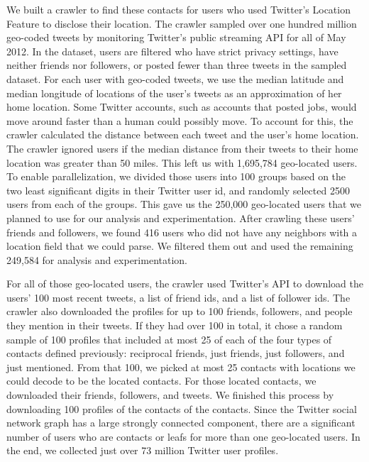 We built a crawler to find these contacts for users who used Twitter's Location
Feature to disclose their location.
The crawler sampled over one hundred million geo-coded tweets by monitoring
Twitter's public streaming API for all of May 2012.
In the dataset, users are filtered who have strict privacy settings, have
neither friends nor followers, or posted fewer than three tweets in the sampled
dataset.
For each user with geo-coded tweets, we use the median latitude and median
longitude of locations of the user's tweets as an approximation of her home
location.
Some Twitter accounts, such as accounts that posted jobs, would
move around faster than a human could possibly move.
To account for this, the crawler calculated the distance between each tweet and
the user's home location.
The crawler ignored users if the median distance from their tweets to their
home location was greater than 50 miles.
This left us with 1,695,784 geo-located users.
To enable parallelization, we divided those users into 100 groups based on
the two least significant digits in their Twitter user id, and randomly selected
2500 users from each of the groups.
%
This gave us the 250,000 geo-located users that we planned to use for our
analysis and experimentation.
%
After crawling these users' friends and followers, we found 416 users who did
not have any neighbors with a location field that we could parse.
%
We filtered them out and used the remaining 249,584 for analysis and
experimentation.

For all of those geo-located users, the crawler used Twitter's API to download
the users' 100 most recent tweets, a list of friend ids, and a list of follower ids.
The crawler also downloaded the profiles for up to 100 friends, followers, and
people they mention in their tweets.
%
If they had over 100 in total, it chose a random sample of 100 profiles that
included at most 25 of each of the four types of contacts defined previously:
reciprocal friends, just friends, just followers, and just mentioned.
%
From that 100, we picked at most 25 contacts with locations we could decode to
be the located contacts. For those located contacts, we downloaded their
friends, followers, and tweets.
%
We finished this process by downloading 100 profiles of the contacts of the
contacts.
%
Since the Twitter social network graph has a large strongly connected
component, there are a significant number of users who are contacts or leafs for
more than one geo-located users.
%
In the end, we collected just over 73 million Twitter user profiles.

